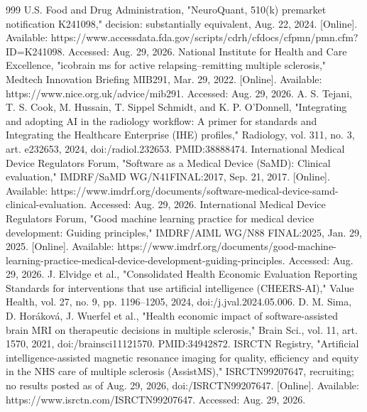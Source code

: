 \documentclass[journal,twoside,web]{ieeecolor}
\begin{document}
\begin{thebibliography}{999}
 U.S. Food and Drug Administration, "NeuroQuant, 510(k) premarket notification K241098," decision: substantially equivalent, Aug. 22, 2024. [Online]. Available: https:/\allowbreak /\allowbreak \allowbreak www.accessdata.fda.gov/\allowbreak scripts/\allowbreak cdrh/\allowbreak cfdocs/\allowbreak cfpmn/\allowbreak pmn.cfm?ID=K241098. Accessed: Aug. 29, 2026.
 National Institute for Health and Care Excellence, "icobrain ms for active relapsing--remitting multiple sclerosis," Medtech Innovation Briefing MIB291, Mar. 29, 2022. [Online]. Available: https:/\allowbreak /\allowbreak \allowbreak www.nice.org.uk/\allowbreak advice/\allowbreak mib291. Accessed: Aug. 29, 2026.
 A. S. Tejani, T. S. Cook, M. Hussain, T. Sippel Schmidt, and K. P. O'Donnell, "Integrating and adopting AI in the radiology workflow: A primer for standards and Integrating the Healthcare Enterprise (IHE) profiles," Radiology, vol. 311, no. 3, art. e232653, 2024, doi:/\allowbreak radiol.232653. PMID:38888474.
 International Medical Device Regulators Forum, "Software as a Medical Device (SaMD): Clinical evaluation," IMDRF/\allowbreak SaMD WG/\allowbreak N41FINAL:2017, Sep. 21, 2017. [Online]. Available: https:/\allowbreak /\allowbreak \allowbreak www.imdrf.org/\allowbreak documents/\allowbreak software-medical-device-samd-clinical-evaluation. Accessed: Aug. 29, 2026.
 International Medical Device Regulators Forum, "Good machine learning practice for medical device development: Guiding principles," IMDRF/\allowbreak AIML WG/\allowbreak N88 FINAL:2025, Jan. 29, 2025. [Online]. Available: https:/\allowbreak /\allowbreak \allowbreak www.imdrf.org/\allowbreak documents/\allowbreak good-machine-learning-practice-medical-device-development-guiding-principles. Accessed: Aug. 29, 2026.
 J. Elvidge et al., "Consolidated Health Economic Evaluation Reporting Standards for interventions that use artificial intelligence (CHEERS-AI)," Value Health, vol. 27, no. 9, pp. 1196--1205, 2024, doi:/\allowbreak j.jval.2024.05.006.
 D. M. Sima, D. Horáková, J. Wuerfel et al., "Health economic impact of software-assisted brain MRI on therapeutic decisions in multiple sclerosis," Brain Sci., vol. 11, art. 1570, 2021, doi:/\allowbreak brainsci11121570. PMID:34942872.
 ISRCTN Registry, "Artificial intelligence-assisted magnetic resonance imaging for quality, efficiency and equity in the NHS care of multiple sclerosis (AssistMS)," ISRCTN99207647, recruiting; no results posted as of Aug. 29, 2026, doi:/\allowbreak ISRCTN99207647. [Online]. Available: https:/\allowbreak /\allowbreak \allowbreak www.isrctn.com/\allowbreak ISRCTN99207647. Accessed: Aug. 29, 2026.
\end{thebibliography}
\end{document}
